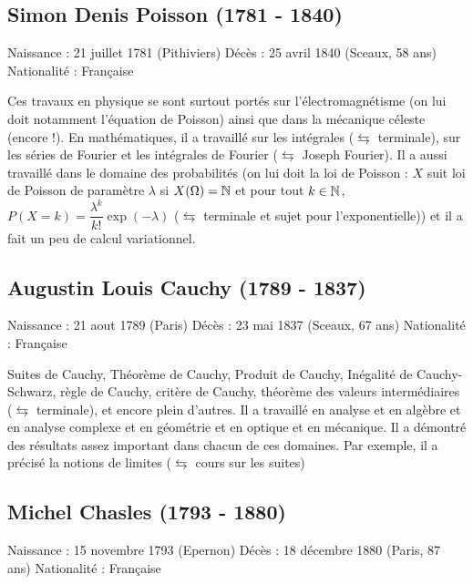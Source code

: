 \subsection*{Simon Denis Poisson (1781 - 1840)}
Naissance : 21 juillet 1781 (Pithiviers)\newline
Décès : 25 avril 1840 (Sceaux, 58 ans)\newline
Nationalité : Française\newline

Ces travaux en physique se sont surtout portés sur l'électromagnétisme (on lui doit notamment l'équation de Poisson) ainsi que dans la mécanique céleste (encore !). En mathématiques, il a travaillé sur les intégrales ($\leftrightarrows$ terminale), sur les séries de Fourier et les intégrales de Fourier ($\leftrightarrows$ Joseph Fourier). Il a aussi travaillé dans le domaine des probabilités (on lui doit la loi de Poisson : $X$ suit loi de Poisson de paramètre $\lambda$ si $X(\Omega) = \mathbb{N}$ et pour tout $k \in \mathbb{N}$, $P(X = k) = \dfrac{\lambda^k}{k!} \exp{(-\lambda)}$ ($\leftrightarrows$ terminale et sujet pour l'exponentielle)) et il a fait un peu de calcul variationnel. 
\subsection*{Augustin Louis Cauchy (1789 - 1837)}
Naissance : 21 aout 1789 (Paris)\newline
Décès : 23 mai 1837 (Sceaux, 67 ans)\newline
Nationalité : Française\newline

Suites de Cauchy, Théorème de Cauchy, Produit de Cauchy, Inégalité de Cauchy-Schwarz, règle de Cauchy, critère de Cauchy, théorème des valeurs intermédiaires ($\leftrightarrows$ terminale),  et encore plein d'autres. Il a travaillé en analyse et en algèbre et en analyse complexe et en géométrie et en optique et en mécanique. Il a démontré des résultats assez important dans chacun de ces domaines. Par exemple, il a précisé la notions de limites ($\leftrightarrows$ cours sur les suites)

\subsection*{Michel Chasles (1793 - 1880)}
Naissance : 15 novembre 1793 (Epernon)\newline
Décès : 18 décembre 1880 (Paris, 87 ans)\newline
Nationalité : Française\newline

